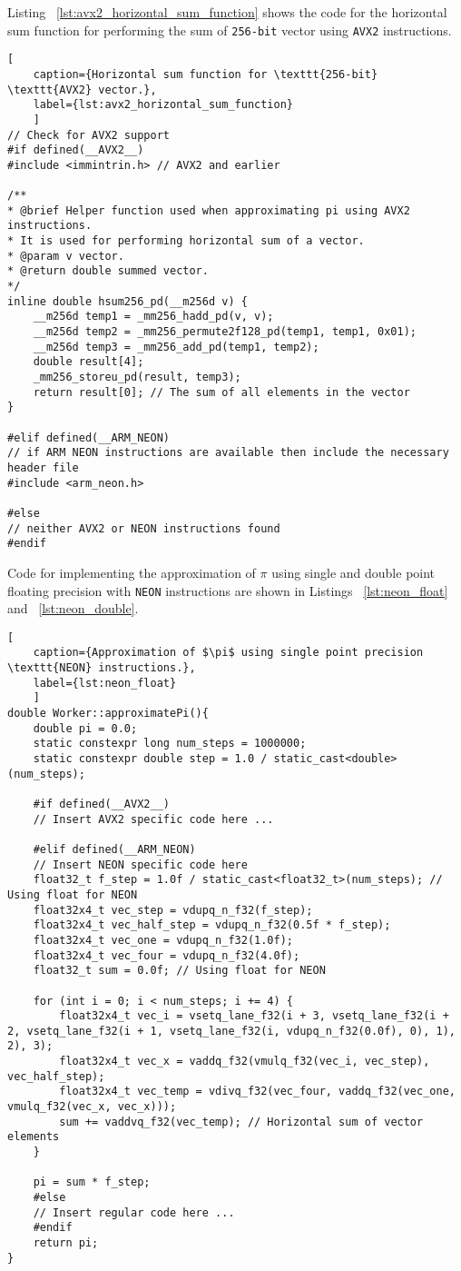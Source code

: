 Listing ~\ref{lst:avx2_horizontal_sum_function} shows the code for the horizontal sum function for performing the sum of \texttt{256-bit} vector using \texttt{AVX2} instructions. 

\begin{lstlisting}[
	caption={Horizontal sum function for \texttt{256-bit} \texttt{AVX2} vector.},
	label={lst:avx2_horizontal_sum_function}
	]
// Check for AVX2 support
#if defined(__AVX2__)
#include <immintrin.h> // AVX2 and earlier

/**
* @brief Helper function used when approximating pi using AVX2 instructions. 
* It is used for performing horizontal sum of a vector. 
* @param v vector. 
* @return double summed vector.
*/
inline double hsum256_pd(__m256d v) {
	__m256d temp1 = _mm256_hadd_pd(v, v);
	__m256d temp2 = _mm256_permute2f128_pd(temp1, temp1, 0x01);
	__m256d temp3 = _mm256_add_pd(temp1, temp2);
	double result[4];
	_mm256_storeu_pd(result, temp3);
	return result[0]; // The sum of all elements in the vector
}

#elif defined(__ARM_NEON)
// if ARM NEON instructions are available then include the necessary header file 
#include <arm_neon.h>

#else
// neither AVX2 or NEON instructions found 
#endif

\end{lstlisting}

Code for implementing the approximation of $\pi$ using single and double point floating precision with \texttt{NEON} instructions are shown in Listings ~\ref{lst:neon_float} and ~\ref{lst:neon_double}.

\begin{lstlisting}[
	caption={Approximation of $\pi$ using single point precision \texttt{NEON} instructions.},
	label={lst:neon_float}
	]
double Worker::approximatePi(){
	double pi = 0.0;
	static constexpr long num_steps = 1000000;
	static constexpr double step = 1.0 / static_cast<double>(num_steps);
	
	#if defined(__AVX2__)
	// Insert AVX2 specific code here ...

	#elif defined(__ARM_NEON)
	// Insert NEON specific code here
	float32_t f_step = 1.0f / static_cast<float32_t>(num_steps); // Using float for NEON
	float32x4_t vec_step = vdupq_n_f32(f_step);
	float32x4_t vec_half_step = vdupq_n_f32(0.5f * f_step);
	float32x4_t vec_one = vdupq_n_f32(1.0f);
	float32x4_t vec_four = vdupq_n_f32(4.0f);
	float32_t sum = 0.0f; // Using float for NEON
	
	for (int i = 0; i < num_steps; i += 4) {
		float32x4_t vec_i = vsetq_lane_f32(i + 3, vsetq_lane_f32(i + 2, vsetq_lane_f32(i + 1, vsetq_lane_f32(i, vdupq_n_f32(0.0f), 0), 1), 2), 3);
		float32x4_t vec_x = vaddq_f32(vmulq_f32(vec_i, vec_step), vec_half_step);
		float32x4_t vec_temp = vdivq_f32(vec_four, vaddq_f32(vec_one, vmulq_f32(vec_x, vec_x)));
		sum += vaddvq_f32(vec_temp); // Horizontal sum of vector elements
	}
	
	pi = sum * f_step;
	#else
	// Insert regular code here ...
	#endif
	return pi;
}
\end{lstlisting}


